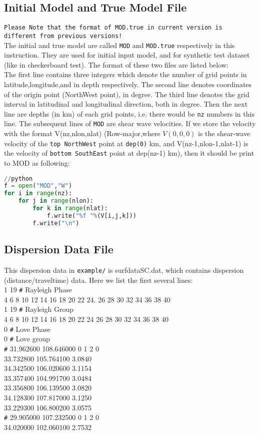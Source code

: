 \documentclass[UTF8]{article}
\begin{document}
\subsection{Initial Model and True Model File}
\texttt{Please Note that the format of MOD.true in current version 
is different from previous versions!} \\ 

The initial and true model are called \verb!MOD! 
and \verb!MOD.true! respectively in this instruction. 
They are used for initial input model, 
and for synthetic test dataset (like in checkerboard test). 
The format of these two files are listed below: \\
 The first line contains 
three integers which denote the number of grid points
in latitude,longitude,and in 
depth respectively. The second line denotes coordinates 
of the origin point (NorthWest point), in degree. The third 
line denotes the grid interval in latitudinal and 
longitudinal direction, both in degree. Then the next line 
are depths (in km) of each grid points,
i.e. there would be \texttt{nz} numbers in this line. 
The subsequent lines of \verb!MOD! are shear wave velocities.
If we store the velocity with the format V(nz,nlon,nlat)
(Row-major,where $V(0,0,0)$ is the shear-wave velocity of the 
\texttt{top NorthWest} point at \texttt{dep(0)} km, and V(nz-1,nlon-1,nlat-1) is 
the velocity of \texttt{bottom SouthEast} point at dep(nz-1) km), then it 
should be print to MOD as following:
\begin{lstlisting}[language=python]
//python
f = open("MOD","W")
for i in range(nz):
    for j in range(nlon):
        for k in range(nlat):
            f.write("%f "%(V[i,j,k]))
        f.write("\n")
\end{lstlisting}

\subsection{Dispersion Data File}
This dispersion data in \verb!example/! is surfdataSC.dat,
which contains dispersion (distance/traveltime) data. Here we list the first several lines:\\
1 19		 \verb!#! Rayleigh Phase \\
4 6 8 10 12 14 16 18 20 22 24. 26 28 30 32 34 36 38 40 \\
1 19		 \verb!#! Rayleigh Group \\
4 6 8 10 12 14 16 18 20 22 24 26 28 30 32 34 36 38 40  \\
0		\verb!#! Love Phase \\
0		 \verb!#! Love group \\
\verb!#!  31.962600 108.646000 0 1 2 0\\
33.732800 105.764100 3.0840\\
34.342500 106.020600 3.1154\\
33.357400 104.991700 3.0484\\
33.356800 106.139500 3.0820\\
34.128300 107.817000 3.1250\\
33.229300 106.800200 3.0575\\
\verb!#! 29.905000 107.232500 0 1 2 0\\
34.020000 102.060100 2.7532\\
\end{document}
